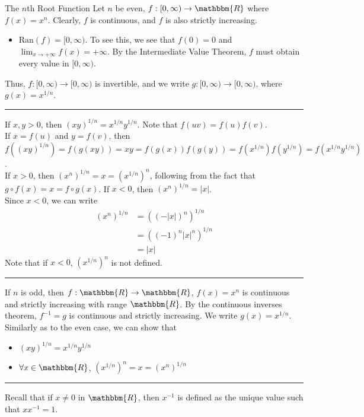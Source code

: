 \documentclass[10pt]{extarticle}
\newcommand{\ran}{\text{Ran}}
\newcommand{\R}{\mathbbm{R}}
\begin{document}
  \begin{problem}{The $n$th Root Function}
    Let $n$ be even, $f:[0,\infty)\rightarrow \R$ where $f(x) = x^n$. Clearly, $f$ is continuous, and $f$ is also strictly increasing.
    \begin{itemize}
      \item $\ran(f) = [0,\infty)$. To see this, we see that $f(0) = 0$ and $\lim_{x\rightarrow +\infty}f(x) = +\infty$. By the Intermediate Value Theorem, $f$ must obtain every value in $[0,\infty)$.
    \end{itemize}
    Thus, $f:[0,\infty) \rightarrow [0,\infty)$ is invertible, and we write $g: [0,\infty) \rightarrow [0,\infty)$, where $g(x) = x^{1/n}$.\\
    \vspace{4pt}
    \rule{\textwidth}{0.4pt}
    \vspace{4pt}
    If $x,y > 0$, then $(xy)^{1/n} = x^{1/n}y^{1/n}$. Note that $f(uv) = f(u)f(v)$.\\

    If $x = f(u)$ and $y = f(v)$, then $f\left((xy)^{1/n}\right) = f(g(xy)) = xy = f(g(x))f(g(y)) = f(x^{1/n})f(y^{1/n}) = f(x^{1/n}y^{1/n})$.\\

    If $x > 0$, then $\left(x^{n}\right)^{1/n} = x = \left(x^{1/n}\right)^{n}$, following from the fact that $g\circ f(x) = x = f\circ g(x)$. If $x < 0$, then $\left(x^n\right)^{1/n} = |x|$.\\

    Since $x < 0$, we can write
    \begin{align*}
      (x^n)^{1/n} &= \left(\left(-|x|\right)^{n}\right)^{1/n}\\
                  &= \left(\left(-1\right)^n|x|^{n}\right)^{1/n}\\
                  &= |x|
    \end{align*}
    Note that if $x < 0$, $\left(x^{1/n}\right)^{n}$ is not defined.
    \vspace{4pt}
    \rule{\textwidth}{0.4pt}
    \vspace{4pt}
    If $n$ is odd, then $f: \R\rightarrow \R$, $f(x) = x^n$ is continuous and strictly increasing with range $\R$. By the continuous inverses theorem, $f^{-1} = g$ is continuous and strictly increasing. We write $g(x)=x^{1/n}$.\\

    Similarly as to the even case, we can show that
    \begin{itemize}
      \item $(xy)^{1/n} = x^{1/n}y^{1/n}$
      \item $\forall x\in\R$, $\left(x^{1/n}\right)^n = x = \left(x^n\right)^{1/n}$
    \end{itemize}
    \vspace{4pt}
    \rule{\textwidth}{0.4pt}
    \vspace{4pt}
    Recall that if $x\neq 0$ in $\R$, then $x^{-1}$ is defined as the unique value such that $xx^{-1} = 1$.\\


\end{problem}
\end{document}
